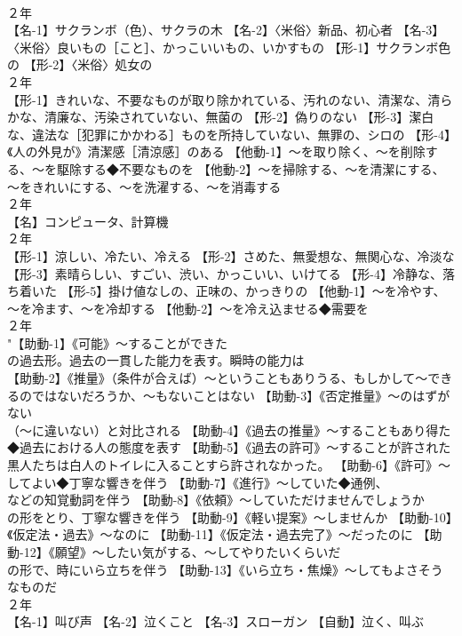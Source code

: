 \documentclass[8pt]{extreport}
\begin{document}
\begin{CJK}{UTF8}{min}
\\	２年	
\\	【名-1】サクランボ（色）、サクラの木 【名-2】〈米俗〉新品、初心者 【名-3】〈米俗〉良いもの［こと］、かっこいいもの、いかすもの 【形-1】サクランボ色の 【形-2】〈米俗〉処女の
\\	２年	
\\	【形-1】きれいな、不要なものが取り除かれている、汚れのない、清潔な、清らかな、清廉な、汚染されていない、無菌の 【形-2】偽りのない 【形-3】潔白な、違法な［犯罪にかかわる］ものを所持していない、無罪の、シロの 【形-4】《人の外見が》清潔感［清涼感］のある 【他動-1】～を取り除く、～を削除する、～を駆除する◆不要なものを 【他動-2】～を掃除する、～を清潔にする、～をきれいにする、～を洗濯する、～を消毒する
\\	２年	
\\	【名】コンピュータ、計算機
\\	２年	
\\	【形-1】涼しい、冷たい、冷える 【形-2】さめた、無愛想な、無関心な、冷淡な 【形-3】素晴らしい、すごい、渋い、かっこいい、いけてる 【形-4】冷静な、落ち着いた 【形-5】掛け値なしの、正味の、かっきりの 【他動-1】～を冷やす、～を冷ます、～を冷却する 【他動-2】～を冷え込ませる◆需要を
\\	２年	
\\	"【助動-1】《可能》～することができた
\\	の過去形。過去の一貫した能力を表す。瞬時の能力は 
\\	【助動-2】《推量》（条件が合えば）～ということもありうる、もしかして～できるのではないだろうか、～もないことはない 【助動-3】《否定推量》～のはずがない
\\	（～に違いない）と対比される 【助動-4】《過去の推量》～することもあり得た◆過去における人の態度を表す 【助動-5】《過去の許可》～することが許された 
\\	黒人たちは白人のトイレに入ることすら許されなかった。 【助動-6】《許可》～してよい◆丁寧な響きを伴う 【助動-7】《進行》～していた◆通例、
\\	などの知覚動詞を伴う 【助動-8】《依頼》～していただけませんでしょうか
\\	の形をとり、丁寧な響きを伴う 【助動-9】《軽い提案》～しませんか 【助動-10】《仮定法・過去》～なのに 【助動-11】《仮定法・過去完了》～だったのに 【助動-12】《願望》～したい気がする、～してやりたいくらいだ
\\	の形で、時にいら立ちを伴う 【助動-13】《いら立ち・焦燥》～してもよさそうなものだ
\\	２年	
\\	【名-1】叫び声 【名-2】泣くこと 【名-3】スローガン 【自動】泣く、叫ぶ

\end{CJK}
\end{document}
